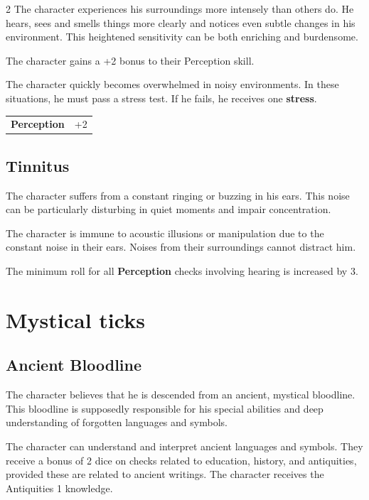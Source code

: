 \begin{multicols}{2}
    The character experiences his surroundings more intensely than others do. He hears, sees and smells things more clearly and notices even subtle changes in his environment. This heightened sensitivity can be both enriching and burdensome.

    The character gains a +2 bonus to their Perception skill.

    The character quickly becomes overwhelmed in noisy environments. In these situations, he must pass a stress test. If he fails, he receives one \textbf{stress}.

    \begin{tabular}{@{}ll@{}}
        \textbf{Perception} & +2\\
    \end{tabular}

    \subsection*{Tinnitus}

    The character suffers from a constant ringing or buzzing in his ears. This noise can be particularly disturbing in quiet moments and impair concentration.

    The character is immune to acoustic illusions or manipulation due to the constant noise in their ears. Noises from their surroundings cannot distract him.

    The minimum roll for all \textbf{Perception} checks involving hearing is increased by 3.


    \section{Mystical ticks}

    \subsection*{Ancient Bloodline}

    The character believes that he is descended from an ancient, mystical bloodline. This bloodline is supposedly responsible for his special abilities and deep understanding of forgotten languages and symbols.

    The character can understand and interpret ancient languages and symbols. They receive a bonus of 2 dice on checks related to education, history, and antiquities, provided these are related to ancient writings. The character receives the Antiquities 1 knowledge.


\end{multicols}
